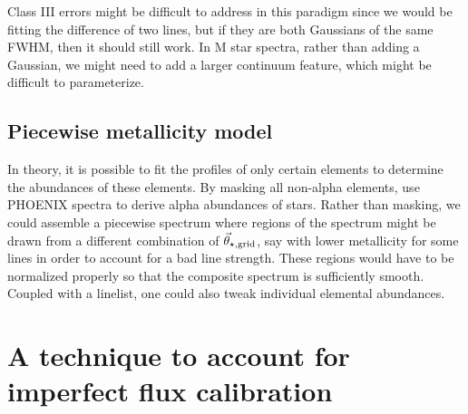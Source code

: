 \documentclass[preprint]{aastex} %
\newcommand{\vt}{\vec{\theta}}
\newcommand{\vg}{\vt_{\star, {\rm grid}}}
\begin{document}
Class III errors might be difficult to address in this paradigm since we would be fitting the difference of two lines, but if they are both Gaussians of the same FWHM, then it should still work. In M star spectra, rather than adding a Gaussian, we might need to add a larger continuum feature, which might be difficult to parameterize.

\subsection{Piecewise metallicity model}
In theory, it is possible to fit the profiles of only certain elements to determine the abundances of these elements. By masking all non-alpha elements, \citet{hus12} use PHOENIX spectra \citep{hwd+13} to derive alpha abundances of stars. Rather than masking, we could assemble a piecewise spectrum where regions of the spectrum might be drawn from a different combination of $\vg$, say with lower metallicity for some lines in order to account for a bad line strength. These regions would have to be normalized properly so that the composite spectrum is sufficiently smooth. Coupled with a linelist, one could also tweak individual elemental abundances.

\clearpage
\appendix
\section{A technique to account for imperfect flux calibration}
\label{sec:chebyshev}
\end{document}
